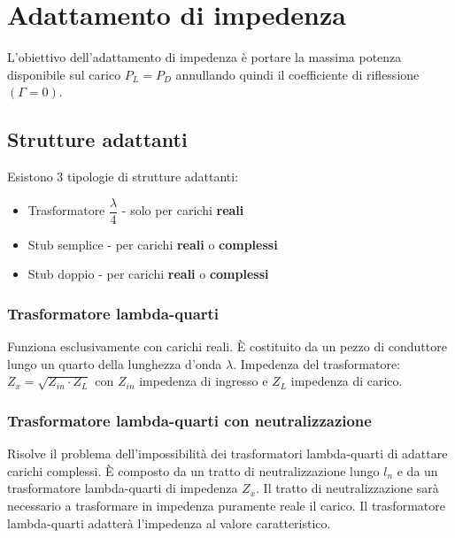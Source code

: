 \documentclass{article}
\begin{document}
\section{Adattamento di impedenza}
L'obiettivo dell'adattamento di impedenza è portare la massima potenza disponibile sul carico \(P_L = P_D\) annullando quindi il coefficiente di riflessione \( (\Gamma = 0) \).

\subsection{Strutture adattanti}
Esistono 3 tipologie di strutture adattanti:\
\begin{itemize}
	\item Trasformatore \( \dfrac{\lambda}{4} \) - solo per carichi \textbf{reali}
	\item Stub semplice - per carichi \textbf{reali} o \textbf{complessi}
	\item Stub doppio - per carichi \textbf{reali} o \textbf{complessi}
\end{itemize}

\subsubsection{Trasformatore lambda-quarti}
Funziona esclusivamente con carichi reali. \`E costituito da un pezzo di conduttore lungo un quarto della lunghezza d'onda \( \lambda \).
Impedenza del trasformatore: \(Z_x = \sqrt{Z_{in} \cdot Z_L} \) con \(Z_{in}\) impedenza di ingresso e \(Z_L\) impedenza di carico.

\subsubsection{Trasformatore lambda-quarti con neutralizzazione}
Risolve il problema dell'impossibilità dei trasformatori lambda-quarti di adattare carichi complessi.
\`E composto da un tratto di neutralizzazione lungo \(l_n\) e da un trasformatore lambda-quarti di impedenza \(Z_x\).
Il tratto di neutralizzazione sarà necessario a trasformare in impedenza puramente reale il carico.
Il trasformatore lambda-quarti adatterà l'impedenza al valore caratteristico.
\end{document}
